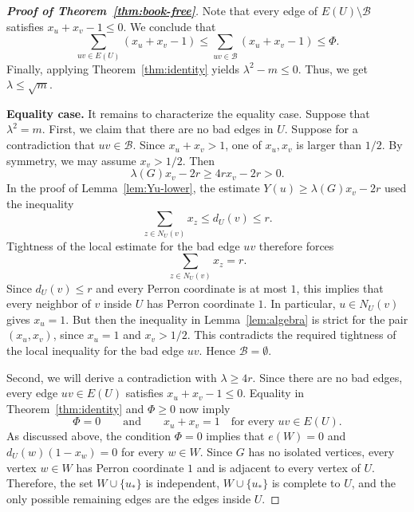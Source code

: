 \documentclass[10pt,a4paper]{amsart}
\renewcommand{\le}{\leqslant}
\renewcommand{\ge}{\geqslant}
\begin{document}
\begin{proof}[{\bf Proof of Theorem~\ref{thm:book-free}}]
Note that every edge of $E(U)\setminus\mathcal{B}$ satisfies $x_u+x_v-1\le 0$. We conclude that 
\[
\sum_{uv\in E(U)}(x_u+x_v-1)
\le
\sum_{uv\in \mathcal{B}}(x_u+x_v-1)
\le \Phi.
\]
Finally, applying Theorem~\ref{thm:identity} yields 
$
\lambda^2-m 
\le 0$. 
Thus, we get $\lambda \le \sqrt{m}$. 


\smallskip 
\noindent 
{\bf Equality case.}
It remains to characterize the equality case. Suppose that $\lambda^2=m$. First, 
we claim that there are no bad edges in $U$. Suppose for a contradiction that $uv\in\mathcal B$. Since $x_u+ x_v>1$, one of $x_u,x_v$ is larger than $1/2$. By symmetry, we may assume $x_v>1/2$. Then
\[
\lambda(G)x_v-2r\ge 4rx_v-2r>0.
\]
In the proof of Lemma~\ref{lem:Yu-lower}, the estimate
$Y(u)\ge \lambda(G)x_v-2r$ 
used the inequality
\[
\sum_{z\in N_U(v)}x_z\le d_U(v)\le r.
\]
Tightness of the local estimate for the bad edge $uv$ therefore forces
\[
\sum_{z\in N_U(v)}x_z=r.
\]
Since $d_U(v)\le r$ and every Perron coordinate is at most $1$, this implies that every neighbor of $v$ inside $U$ has Perron coordinate $1$. In particular, $u\in N_U(v)$ gives $x_u=1$. 
But then the inequality in Lemma~\ref{lem:algebra} is strict for the pair $(x_u,x_v)$, since $x_u=1$ and $x_v>1/2$. 
This contradicts the required tightness of the local inequality for the bad edge $uv$. Hence
$\mathcal B= \emptyset$. 

Second, we will derive a contradiction with $\lambda \ge 4r$. 
Since there are no bad edges, every edge $uv\in E(U)$ satisfies $x_u+x_v-1\le 0$. Equality in Theorem~\ref{thm:identity} and $\Phi\ge 0$ now imply
\[
\Phi=0
\qquad\text{and}\qquad
x_u+x_v=1\quad\text{for every }uv\in E(U).
\]
As discussed above, the condition $\Phi=0$ implies that $e(W)=0$ and $d_U(w)(1-x_w)=0$ for every $w\in W$. 
Since $G$ has no isolated vertices, every vertex $w\in W$ has Perron coordinate $1$ and is adjacent to every vertex of $U$. Therefore, 
the set $W\cup\{u_*\}$ is independent, $W\cup\{u_*\}$ is complete to $U$, and the only possible remaining edges are the edges inside $U$.


\end{proof}
\end{document}
